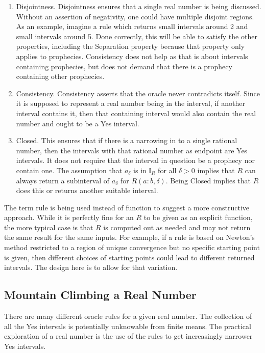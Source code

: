 \documentclass[12pt]{article}
\begin{document}
\begin{enumerate}
    \item Disjointness. Disjointness ensures that a single real number is being discussed. Without an assertion of negativity, one could have multiple disjoint regions.  As an example, imagine a rule which returns small intervals around 2 and small intervals around 5. Done correctly, this will be able to satisfy the other properties, including the Separation property because that property only applies to prophecies. Consistency does not help as that is about intervals containing prophecies, but does not demand that there is a prophecy containing other prophecies.  
    
    \item Consistency. Consistency asserts that the oracle never contradicts itself. Since it is supposed to represent a real number being in the interval, if another interval contains it, then that containing interval would also contain the real number and ought to be a Yes interval. 
    
    \item Closed. This ensures that if there is a narrowing in to a single rational number, then the intervals with that rational number as endpoint are Yes intervals. It does not require that the interval in question be a prophecy nor contain one. The assumption that $a_\delta$ is in $\mathbb{I}_R$ for all $\delta >0$ implies that $R$ can always return a subinterval of $a_\delta$ for $R(a:b, \delta)$. Being Closed implies that $R$ does this or returns another suitable interval. 

\end{enumerate}

The term rule is being used instead of function to suggest a more constructive approach. While it is perfectly fine for an $R$ to be given as an explicit function, the more typical case is that $R$ is computed out as needed and may not return the same result for the same inputs. For example, if a rule is based on Newton's method restricted to a region of unique convergence but no specific starting point is given, then different choices of starting points could lead to different returned intervals. The design here is to allow for that variation. 

\subsection{Mountain Climbing a Real Number}

There are many different oracle rules for a given real number. The collection of all the Yes intervals is potentially unknowable from finite means. The practical exploration of a real number is the use of the rules to get increasingly narrower Yes intervals.  
\end{document}

